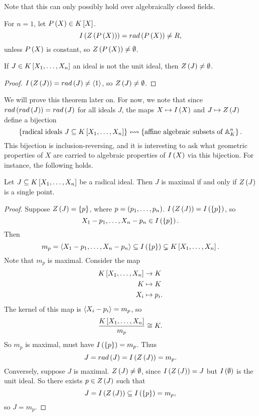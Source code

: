 Note that this can only possibly hold over algebraically closed fields.

\begin{example2}
For $ n = 1 $, let $ P\rb{X} \in K\sb{X} $.
$$ I\rb{Z\rb{P\rb{X}}} = rad\rb{P\rb{X}} \ne R, $$
unless $ P\rb{X} $ is constant, so $ Z\rb{P\rb{X}} \ne \emptyset $.
\end{example2}

\begin{corollary}
If $ J \in K\sb{X_1, \dots, X_n} $ an ideal is not the unit ideal, then $ Z\rb{J} \ne \emptyset $.
\end{corollary}

\begin{proof}
$ I\rb{Z\rb{J}} = rad\rb{J} \ne \ab{1} $, so $ Z\rb{J} \ne \emptyset $.
\end{proof}


We will prove this theorem later on. For now, we note that since $ rad\rb{rad\rb{J}} = rad\rb{J} $ for all ideals $ J $, the maps $ X \mapsto I\rb{X} $ and $ J \mapsto Z\rb{J} $ define a bijection
$$ \cb{\text{radical ideals } J \subseteq K\sb{X_1, \dots, X_n}} \leftrightsquigarrow \cb{\text{affine algebraic subsets of } \A_K^n}. $$
This bijection is inclusion-reversing, and it is interesting to ask what geometric properties of $ X $ are carried to algebraic properties of $ I\rb{X} $ via this bijection. For instance, the following holds.

\begin{proposition}
Let $ J \subseteq K\sb{X_1, \dots, X_n} $ be a radical ideal. Then $ J $ is maximal if and only if $ Z\rb{J} $ is a single point.
\end{proposition}

\begin{proof}
Suppose $ Z\rb{J} = \cb{p} $, where $ p = \rb{p_1, \dots, p_n} $. $ I\rb{Z\rb{J}} = I\rb{\cb{p}} $, so
$$ X_1 - p_1, \dots, X_n - p_n \in I\rb{\cb{p}}. $$
Then
$$ m_p = \ab{X_1 - p_1, \dots, X_n - p_n} \subseteq I\rb{\cb{p}} \subsetneq K\sb{X_1, \dots, X_n}. $$
Note that $ m_p $ is maximal. Consider the map
\begin{align*}
K\sb{X_1, \dots, X_n} & \to K \\
K & \mapsto K \\
X_i & \mapsto p_i.
\end{align*}
The kernel of this map is $ \ab{X_i - p_i} = m_p $, so
$$ \dfrac{K\sb{X_1, \dots, X_n}}{m_p} \cong K. $$
So $ m_p $ is maximal, must have $ I\rb{\cb{p}} = m_p $. Thus
$$ J = rad\rb{J} = I\rb{Z\rb{J}} = m_p. $$
Conversely, suppose $ J $ is maximal. $ Z\rb{J} \ne \emptyset $, since $ I\rb{Z\rb{J}} = J $ but $ I\rb{\emptyset} $ is the unit ideal. So there exists $ p \in Z\rb{J} $ such that
$$ J = I\rb{Z\rb{J}} \subseteq I\rb{\cb{p}} = m_p, $$
so $ J = m_p $.
\end{proof}

